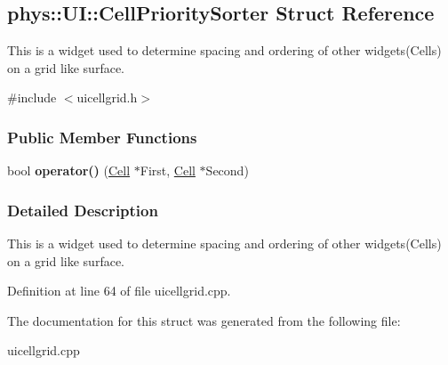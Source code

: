 \hypertarget{structphys_1_1UI_1_1CellPrioritySorter}{
\subsection{phys::UI::CellPrioritySorter Struct Reference}
\label{structphys_1_1UI_1_1CellPrioritySorter}
}


This is a widget used to determine spacing and ordering of other widgets(Cells) on a grid like surface.  




{\ttfamily \#include $<$uicellgrid.h$>$}

\subsubsection*{Public Member Functions}
\begin{DoxyCompactItemize}
\item 
\hypertarget{structphys_1_1UI_1_1CellPrioritySorter_a96651d3e8c3312eab4b25809a6cc4ce6}{
bool {\bfseries operator()} (\hyperlink{classphys_1_1UI_1_1Cell}{Cell} $\ast$First, \hyperlink{classphys_1_1UI_1_1Cell}{Cell} $\ast$Second)}
\label{structphys_1_1UI_1_1CellPrioritySorter_a96651d3e8c3312eab4b25809a6cc4ce6}

\end{DoxyCompactItemize}


\subsubsection{Detailed Description}
This is a widget used to determine spacing and ordering of other widgets(Cells) on a grid like surface. 

Definition at line 64 of file uicellgrid.cpp.



The documentation for this struct was generated from the following file:\begin{DoxyCompactItemize}
\item 
uicellgrid.cpp\end{DoxyCompactItemize}
